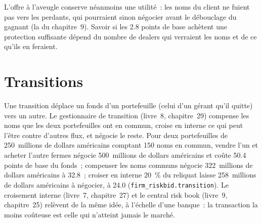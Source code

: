 \begin{omfigure}

\label{fig:mx:portfolio-trades-and-risk-bids:bids}
\end{omfigure}

L'offre à l'aveugle conserve néanmoins une utilité~: les noms du client ne fuient pas vers les perdants, qui pourraient sinon négocier avant le débouclage du gagnant (la  du chapitre~9). Savoir si les 2.8 points de base achètent une protection suffisante dépend du nombre de dealers qui verraient les noms et de ce qu'ils en feraient.

\section{Transitions}

Une transition déplace un fonds d'un portefeuille (celui d'un gérant qu'il quitte) vers un autre. Le gestionnaire de transition (livre~8, chapitre~29) compense les noms
que les deux portefeuilles ont en commun, croise en interne ce qui peut l'être contre d'autres flux, et négocie le reste. Pour deux portefeuilles de 250~millions de dollars américains comptant 150 noms
en commun, vendre l'un et acheter l'autre fermes négocie 500~millions de dollars américains et coûte 50.4 points de base du fonds~; compenser les noms communs négocie
322~millions de dollars américains à 32.8~; croiser en interne 20~\% du reliquat laisse 258~millions de dollars américains à négocier, à 24.0 (\texttt{firm\_riskbid.transition}).
Le croisement interne (livre~7, chapitre~27) et le central risk book (livre~9, chapitre~25) relèvent de la même idée, à l'échelle d'une banque~:
la transaction la moins coûteuse est celle qui n'atteint jamais le marché.

